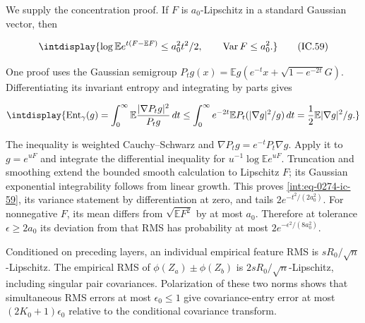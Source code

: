 
We supply the concentration proof. If \(F\) is \(a_0\)-Lipschitz in a standard Gaussian vector, then


\begingroup\renewcommand{\theHequation}{intdisplay.648}
\begin{equation}
\intdisplay{
\log\mathbb E e^{t(F-\mathbb EF)}\le a_0^2t^2/2,
 \qquad\operatorname{Var}F\le a_0^2.
}
\tag{IC.59}
\label{int:eq-0274-ic-59}
\end{equation}
\endgroup


One proof uses the Gaussian semigroup \(P_tg(x)=\mathbb E g(e^{-t}x+\sqrt{1-e^{-2t}}G)\). Differentiating its invariant entropy and integrating by parts gives


\begingroup\renewcommand{\theHequation}{intdisplay.649}
\begin{equation*}
\intdisplay{
\operatorname{Ent}_\gamma(g)=
 \int_0^\infty\mathbb E\frac{|\nabla P_tg|^2}{P_tg}\,dt
 \le\int_0^\infty e^{-2t}\mathbb E P_t(|\nabla g|^2/g)\,dt
 =\frac{1}{2}\mathbb E|\nabla g|^2/g.
}
\end{equation*}
\endgroup


The inequality is weighted Cauchy--Schwarz and \(\nabla P_tg=e^{-t}P_t\nabla g\). Apply it to \(g=e^{uF}\) and integrate the differential inequality for \(u^{-1}\log\mathbb E e^{uF}\). Truncation and smoothing extend the bounded smooth calculation to Lipschitz \(F\); its Gaussian exponential integrability follows from linear growth. This proves \eqref{int:eq-0274-ic-59}, its variance statement by differentiation at zero, and tails \(2e^{-t^2/(2a_0^2)}\). For nonnegative \(F\), its mean differs from \(\sqrt{\mathbb EF^2}\) by at most \(a_0\). Therefore at tolerance \(\epsilon\ge2a_0\) its deviation from that RMS has probability at most \(2e^{-\epsilon^2/(8a_0^2)}\).



Conditioned on preceding layers, an individual empirical feature RMS is \(sR_0/\sqrt n\)-Lipschitz. The empirical RMS of \(\phi(Z_a)\pm\phi(Z_b)\) is \(2sR_0/\sqrt n\)-Lipschitz, including singular pair covariances. Polarization of these two norms shows that simultaneous RMS errors at most \(\epsilon_0\le1\) give covariance-entry error at most \((2K_0+1)\epsilon_0\) relative to the conditional covariance transform.


